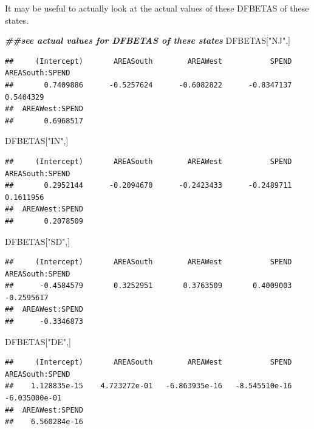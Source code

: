 \documentclass[
]{book}
\newenvironment{Shaded}{\begin{snugshade}}{\end{snugshade}}
\newcommand{\DocumentationTok}[1]{\textcolor[rgb]{0.56,0.35,0.01}{\textbf{\textit{#1}}}}
\newcommand{\NormalTok}[1]{#1}
\newcommand{\StringTok}[1]{\textcolor[rgb]{0.31,0.60,0.02}{#1}}
\begin{document}
It may be useful to actually look at the actual values of these DFBETAS of these states.

\begin{Shaded}
\begin{Highlighting}[]
\DocumentationTok{\#\#see actual values for DFBETAS of these states}
\NormalTok{DFBETAS[}\StringTok{"NJ"}\NormalTok{,]}
\end{Highlighting}
\end{Shaded}

\begin{verbatim}
##     (Intercept)       AREASouth        AREAWest           SPEND AREASouth:SPEND 
##       0.7409886      -0.5257624      -0.6082822      -0.8347137       0.5404329 
##  AREAWest:SPEND 
##       0.6968517
\end{verbatim}

\begin{Shaded}
\begin{Highlighting}[]
\NormalTok{DFBETAS[}\StringTok{"IN"}\NormalTok{,]}
\end{Highlighting}
\end{Shaded}

\begin{verbatim}
##     (Intercept)       AREASouth        AREAWest           SPEND AREASouth:SPEND 
##       0.2952144      -0.2094670      -0.2423433      -0.2489711       0.1611956 
##  AREAWest:SPEND 
##       0.2078509
\end{verbatim}

\begin{Shaded}
\begin{Highlighting}[]
\NormalTok{DFBETAS[}\StringTok{"SD"}\NormalTok{,]}
\end{Highlighting}
\end{Shaded}

\begin{verbatim}
##     (Intercept)       AREASouth        AREAWest           SPEND AREASouth:SPEND 
##      -0.4584579       0.3252951       0.3763509       0.4009003      -0.2595617 
##  AREAWest:SPEND 
##      -0.3346873
\end{verbatim}

\begin{Shaded}
\begin{Highlighting}[]
\NormalTok{DFBETAS[}\StringTok{"DE"}\NormalTok{,]}
\end{Highlighting}
\end{Shaded}

\begin{verbatim}
##     (Intercept)       AREASouth        AREAWest           SPEND AREASouth:SPEND 
##    1.128835e-15    4.723272e-01   -6.863935e-16   -8.545510e-16   -6.035000e-01 
##  AREAWest:SPEND 
##    6.560284e-16
\end{verbatim}
\end{document}
